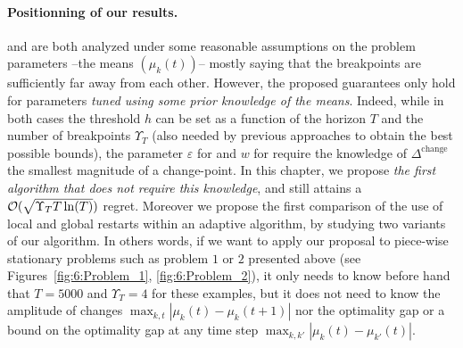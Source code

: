 \paragraph{Positionning of our results.}
%
\CUSUMUCB{} and \MUCB{} are both analyzed under some reasonable assumptions on the problem parameters --the means $(\mu_k(t))$-- mostly saying that the breakpoints are sufficiently far away from each other.
%
However, the proposed guarantees only hold for parameters \emph{tuned using some prior knowledge of the means}.
Indeed, while in both cases the threshold $h$ can be set as a function of the horizon $T$ and the number of breakpoints  $\Upsilon_T$ (also needed by previous approaches to obtain the best possible bounds), the parameter $\varepsilon$ for \CUSUM{} and $w$ for \MUCB{} require the knowledge of $\Delta^{\text{change}}$ the smallest magnitude of a change-point.
%
In this chapter, we propose \emph{the first algorithm that does not require this knowledge}, and still attains a $\mathcal{O}(\sqrt{\Upsilon_T T\ln(T)})$ regret.
Moreover we propose the first comparison of the use of local and global restarts within an adaptive algorithm, by studying two variants of our algorithm.
%
In others words, if we want to apply our proposal to piece-wise stationary problems such as problem $1$ or $2$ presented above (see Figures~\ref{fig:6:Problem_1}, \ref{fig:6:Problem_2}),
it only needs to know before hand that $T=5000$ and $\Upsilon_T=4$ for these examples, but it does not need to know the amplitude of changes $\max_{k,t} |\mu_k(t) - \mu_k(t+1)|$ nor the optimality gap or a bound on the optimality gap at any time step $\max_{k,k'} |\mu_k(t) - \mu_{k'}(t)|$.


